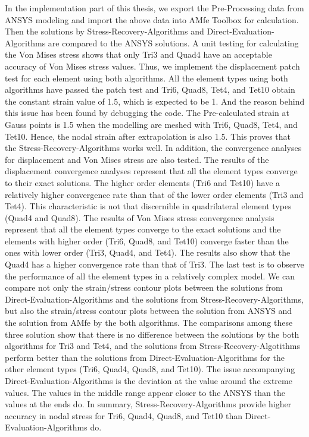In the implementation part of this thesis, we export the Pre-Processing data from ANSYS modeling and import the above data into AMfe Toolbox for calculation. Then the solutions by Stress-Recovery-Algorithms and Direct-Evaluation-Algorithms are compared to the ANSYS solutions. A unit testing for calculating the Von Mises stress shows that only Tri3 and Quad4 have an acceptable accuracy of Von Mises stress values. Thus, we implement the displacement patch test for each element using both algorithms. All the element types using both algorithms have passed the patch test and Tri6, Quad8, Tet4, and Tet10 obtain the constant strain value of 1.5, which is expected to be 1. And the reason behind this issue has been found by debugging the code. The Pre-calculated strain at Gauss points is 1.5 when the modelling are meshed with Tri6, Quad8, Tet4, and Tet10. Hence, the nodal strain after extrapolation is also 1.5. This proves that the Stress-Recovery-Algorithms works well. In addition, the convergence analyses for displacement and Von Mises stress are also tested. The results of the displacement convergence analyses represent that all the element types converge to their exact solutions. The higher order elements (Tri6 and Tet10) have a relatively higher convergence rate than that of the lower order elements (Tri3 and Tet4). This characteristic is not that discernible in quadrilateral element types (Quad4 and Quad8). The results of Von Mises stress convergence analysis represent that all the element types converge to the exact solutions and the elements with higher order (Tri6, Quad8, and Tet10) converge faster than the ones with lower order (Tri3, Quad4, and Tet4). The results also show that the Quad4 has a higher convergence rate than that of Tri3. The last test is to observe the performance of all the element types in a relatively complex model. We can compare not only the strain/stress contour plots between the solutions from Direct-Evaluation-Algorithms and the solutions from Stress-Recovery-Algorithms, but also the strain/stress contour plots between the solution from ANSYS and the solution from AMfe by the both algorithms. The comparisons among these three solution show that there is no difference between the solutions by the both algorithms for Tri3 and Tet4, and the solutions from Stress-Recovery-Algotithms perform better than the solutions from Direct-Evaluation-Algorithms for the other element types (Tri6, Quad4, Quad8, and Tet10). The issue accompanying Direct-Evaluation-Algorithms is the deviation at the value around the extreme values. The values in the middle range appear closer to the ANSYS than the values at the ends do. In summary, Stress-Recovery-Algorithms provide higher accuracy in nodal stress for Tri6, Quad4, Quad8, and Tet10 than Direct-Evaluation-Algorithms do.  


